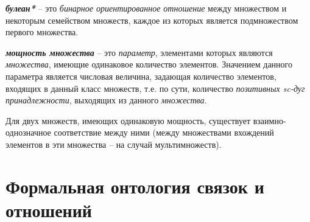 
	
\textbf{\textit{булеан*}} – это \textit{бинарное ориентированное отношение} между множеством и некоторым семейством множеств, каждое из которых является подмножеством первого множества.




\textbf{\textit{мощность множества}} – это \textit{параметр}, элементами которых являются \textit{множества}, имеющие одинаковое количество элементов. Значением данного параметра является числовая величина, задающая количество элементов, входящих в данный класс множеств, т.е. по сути, количество \textit{позитивных sc-дуг принадлежности}, выходящих из данного \textit{множества}.
	
	Для двух множеств, имеющих одинаковую мощность, существует взаимно-однозначное соответствие между ними (между множествами вхождений элементов в эти множества – на случай мультимножеств).

\section{Формальная онтология связок и отношений}

